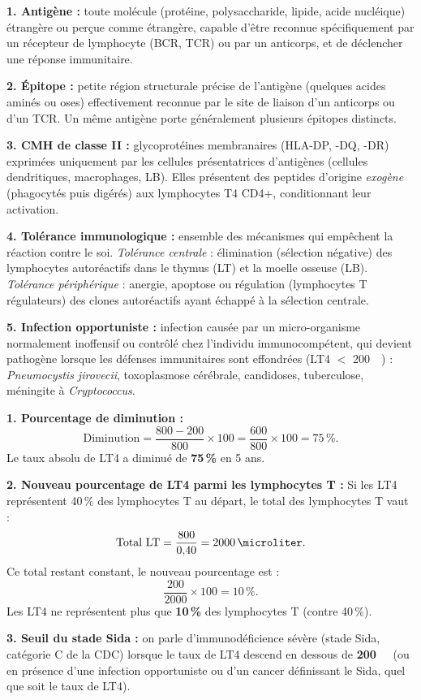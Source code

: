 \documentclass[11pt]{article}
\begin{document}
\begin{corrige}
\textbf{1. Antigène :} toute molécule (protéine, polysaccharide, lipide, acide nucléique) étrangère ou perçue comme étrangère, capable d'être reconnue spécifiquement par un récepteur de lymphocyte (BCR, TCR) ou par un anticorps, et de déclencher une réponse immunitaire.

\textbf{2. Épitope :} petite région structurale précise de l'antigène (quelques acides aminés ou oses) effectivement reconnue par le site de liaison d'un anticorps ou d'un TCR. Un même antigène porte généralement plusieurs épitopes distincts.

\textbf{3. CMH de classe II :} glycoprotéines membranaires (HLA-DP, -DQ, -DR) exprimées uniquement par les cellules présentatrices d'antigènes (cellules dendritiques, macrophages, LB). Elles présentent des peptides d'origine \emph{exogène} (phagocytés puis digérés) aux lymphocytes T4 CD4+, conditionnant leur activation.

\textbf{4. Tolérance immunologique :} ensemble des mécanismes qui empêchent la réaction contre le soi. \emph{Tolérance centrale} : élimination (sélection négative) des lymphocytes autoréactifs dans le thymus (LT) et la moelle osseuse (LB). \emph{Tolérance périphérique} : anergie, apoptose ou régulation (lymphocytes T régulateurs) des clones autoréactifs ayant échappé à la sélection centrale.

\textbf{5. Infection opportuniste :} infection causée par un micro-organisme normalement inoffensif ou contrôlé chez l'individu immunocompétent, qui devient pathogène lorsque les défenses immunitaires sont effondrées (LT4 $<$ \SI{200}{\per\microliter}) : \emph{Pneumocystis jirovecii}, toxoplasmose cérébrale, candidoses, tuberculose, méningite à \emph{Cryptococcus}.
\end{corrige}

\begin{corrige}
\textbf{1. Pourcentage de diminution :}
\[ \text{Diminution} = \frac{800 - 200}{800}\times 100 = \frac{600}{800}\times 100 = 75\,\%. \]
Le taux absolu de LT4 a diminué de \textbf{75\,\%} en 5 ans.

\textbf{2. Nouveau pourcentage de LT4 parmi les lymphocytes T :} Si les LT4 représentent 40\,\% des lymphocytes T au départ, le total des lymphocytes T vaut :
\[ \text{Total LT} = \frac{800}{0{,}40} = \SI{2000}{\per\microliter}. \]
Ce total restant constant, le nouveau pourcentage est :
\[ \frac{200}{2000}\times 100 = 10\,\%. \]
Les LT4 ne représentent plus que \textbf{10\,\%} des lymphocytes T (contre 40\,\%).

\textbf{3. Seuil du stade Sida :} on parle d'immunodéficience sévère (stade Sida, catégorie C de la CDC) lorsque le taux de LT4 descend en dessous de \textbf{\SI{200}{\per\microliter}} (ou en présence d'une infection opportuniste ou d'un cancer définissant le Sida, quel que soit le taux de LT4).
\end{corrige}
\end{document}
